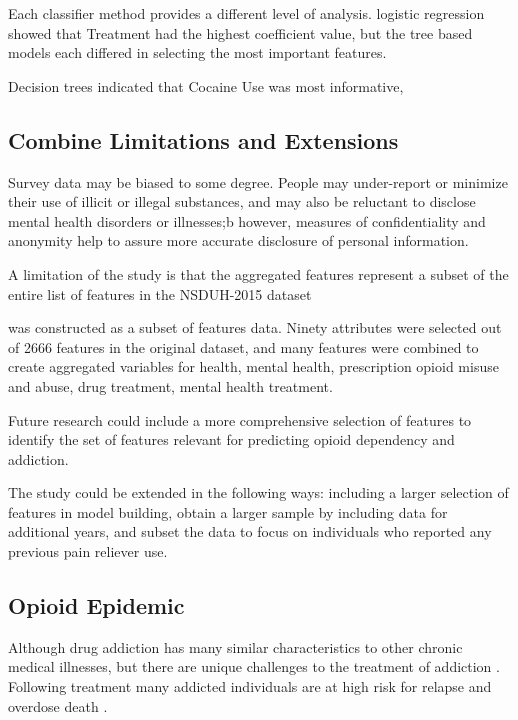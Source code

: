 \documentclass[sigconf]{acmart}
\begin{document}
Each classifier method provides a different level of analysis. 
logistic regression showed that Treatment had the highest coefficient value, but 
the tree based models each differed in selecting the most important features. 

Decision trees indicated that Cocaine Use was most informative,



\subsection{Combine Limitations and Extensions}

Survey data may be biased to some degree. People may under-report or minimize 
their use of illicit or illegal substances, and may also be reluctant to 
disclose mental health disorders or illnesses;b however, measures of 
confidentiality and anonymity help to assure more accurate disclosure 
of personal information. 

A limitation of the study is that the aggregated features represent a subset
of the entire list of features in the NSDUH-2015 dataset 


was constructed as a subset of 
features data. 
Ninety attributes were selected out of 2666 features in the original dataset, 
and many features were combined to create aggregated variables for health, 
mental health, prescription opioid misuse and abuse, drug treatment, mental health
treatment. 

Future research could include a more comprehensive selection of
features to identify the set of features relevant for predicting opioid
dependency and addiction. 

The study could be extended in the following ways: including a larger
selection of features in model building, obtain a larger sample by including 
data for additional years, and subset the data to focus on individuals who 
reported any previous pain reliever use. 



\subsection{Opioid Epidemic}

Although drug addiction has many similar characteristics 
to other chronic medical illnesses, but there are unique challenges to the 
treatment of addiction \cite{marsch12, swendson16}. 
Following treatment many addicted individuals are at high 
risk for relapse and overdose death \cite{shaham03}.
\end{document}
